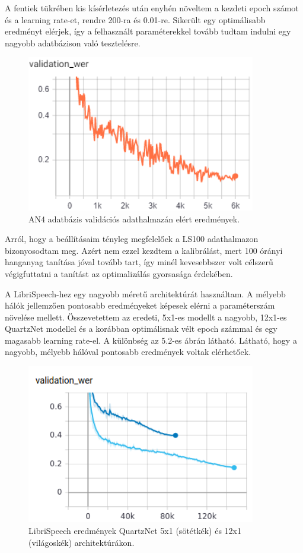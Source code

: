 A fentiek tükrében kis kísérletezés után enyhén növeltem a kezdeti epoch számot és a learning rate-et, rendre 200-ra és 0.01-re. Sikerült egy optimálisabb eredményt elérjek, így a felhasznált paraméterekkel tovább tudtam indulni egy nagyobb adatbázison való tesztelésre.

\begin{figure}[!ht]
\centering
\includegraphics[width=100mm, keepaspectratio]{figures/an4_wer.png}
\caption{AN4 adatbázis validációs adathalmazán elért eredmények.}
\end{figure}

Arról, hogy a beállításaim tényleg megfelelőek a LS100 adathalmazon bizonyosodtam meg. Azért nem ezzel kezdtem a kalibrálást, mert 100 órányi hanganyag tanítása jóval tovább tart, így minél kevesebbszer volt célszerű végigfuttatni a tanítást az optimalizálás gyorsasága érdekében.

A LibriSpeech-hez egy nagyobb méretű architektúrát használtam. A mélyebb hálók jellemzően pontosabb eredményeket képesek elérni a paraméterszám növelése mellett. Összevetettem az eredeti, 5x1-es modellt a nagyobb, 12x1-es QuartzNet modellel és a korábban optimálisnak vélt epoch számmal és egy magasabb learning rate-el. A különbség az 5.2-es ábrán látható. Látható, hogy a nagyobb, mélyebb hálóval pontosabb eredmények voltak elérhetőek.

\begin{figure}[!ht]
\centering
\includegraphics[width=100mm, keepaspectratio]{figures/architecture_comparrison.png}
\caption{LibriSpeech eredmények QuartzNet 5x1 (sötétkék) és 12x1 (világoskék) architektúrákon.}
\end{figure}

